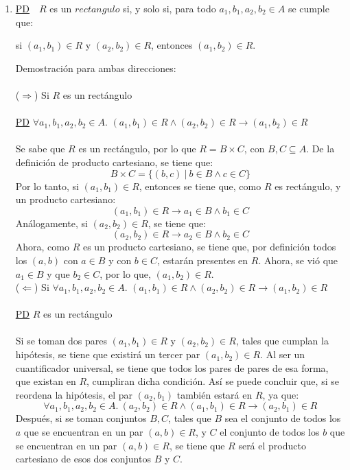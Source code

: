 \documentclass[letter]{article}
\begin{document}
	\begin{pregunta}{1} %
		\begin{enumerate}
		\item \underline{PD}\ \ $R$ es un $rectangulo$ si, y solo si, para todo $a_1, b_1, a_2, b_2 \in A$ se cumple que:
		\begin{center}
			si $(a_1, b_1) \in R$ y $(a_2, b_2) \in R$, entonces $(a_1, b_2) \in R$.
		\end{center}
		Demostración para ambas direcciones: \\ \\
		($\Rightarrow$) Si $R$ es un rectángulo\\\\
		\underline{PD} $\forall a_1, b_1, a_2, b_2 \in A$. $(a_1, b_1) \in R \wedge (a_2, b_2) \in R \rightarrow (a_1, b_2) \in R$\\\\
		Se sabe que $R$ es un rectángulo, por lo que $R=B\times C$, con $B,C \subseteq A$. De la definición de producto cartesiano, se tiene que:
		$$B\times C=\{(b,c)\ |\ b\in B \wedge c \in C\}$$
		Por lo tanto, si $(a_1, b_1) \in R$, entonces se tiene que, como $R$ es rectángulo, y un producto cartesiano:
		$$(a_1, b_1) \in R \rightarrow a_1 \in B \wedge b_1 \in C$$
		Análogamente, si $(a_2, b_2) \in R$, se tiene que:
		$$(a_2, b_2) \in R \rightarrow a_2 \in B \wedge b_2 \in C$$
		Ahora, como $R$ es un producto cartesiano, se tiene que, por definición todos los $(a,b)$ con $a \in B$ y con $b \in C$, estarán presentes en $R$. Ahora, se vió que $a_1 \in B$ y que $b_2 \in C$, por lo que, $(a_1, b_2) \in R$.\\
		
		
		($\Leftarrow$) Si $\forall a_1, b_1, a_2, b_2 \in A$. $(a_1, b_1) \in R \wedge (a_2, b_2) \in R \rightarrow (a_1, b_2) \in R$\\\\
		\underline{PD} $R$ es un rectángulo\\\\
		Si se toman dos pares $(a_1, b_1) \in R$ y $(a_2, b_2) \in R$, tales que cumplan la hipótesis, se tiene que existirá un tercer par $(a_1, b_2) \in R$. Al ser un cuantificador universal, se tiene que todos los pares de pares de esa forma, que existan en $R$, cumpliran dicha condición. Así se puede concluir que, si se reordena la hipótesis, el par $(a_2, b_1)$ también estará en $R$, ya que:
		$$\forall a_1, b_1, a_2, b_2 \in A. \ (a_2, b_2) \in R \wedge (a_1, b_1) \in R \rightarrow (a_2, b_1) \in R$$
		Después, si se toman conjuntos $B, C$, tales que $B$ sea el conjunto de todos los $a$ que se encuentran en un par $(a,b) \in R$, y $C$ el conjunto de todos los $b$ que se encuentran en un par $(a,b) \in R$, se tiene que $R$ será el producto cartesiano de esos dos conjuntos $B$ y $C$.
		

\end{enumerate}
\end{pregunta}
\end{document}
